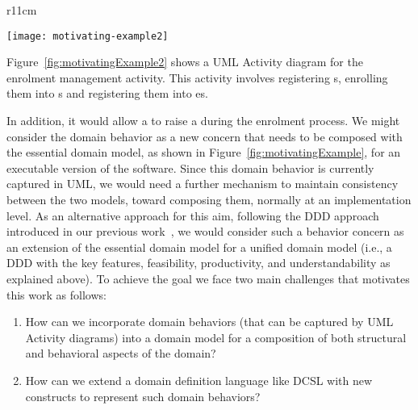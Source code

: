 {\makeatletter
	\let\par\@@par
	\par{}
	\everypar{}
\begin{wrapfigure}{r}{11cm}
	\begin{center}
\vspace{-0.8cm}		\texttt{[image: motivating-example2]}
	\end{center}
\vspace{-0.5cm}
	\caption{A UML Activity diagram to represent the enrolment management activity.}
	\label{fig:motivatingExample2}
\end{wrapfigure}
%
Figure~\ref{fig:motivatingExample2} shows a UML Activity diagram for the enrolment management activity. This activity involves registering s, enrolling them into s and registering them into es.%
\par}%
\noindent In addition, it would allow a  to raise a  during the enrolment process. %
%
We might consider the domain behavior as a new concern that needs to be composed with the essential domain model, as shown in Figure~\ref{fig:motivatingExample}, for an executable version of the software. Since this domain behavior is currently captured in UML, we would need a further mechanism to maintain consistency between the two models, toward composing them, normally at an implementation level. As an alternative approach for this aim, following the DDD approach introduced in our previous work~\cite{le_domain_2018}, we would consider such a behavior concern as an extension of the essential domain model for a unified domain model (i.e., a DDD with the key features, feasibility, productivity, and understandability as explained above). To achieve the goal we face two main challenges that motivates this work as follows:

\begin{enumerate}
    \item How can we incorporate domain behaviors (that can be captured by UML Activity diagrams) into a domain model for a composition of both structural and behavioral aspects of the domain?
    \item How can we extend a domain definition language like DCSL with new constructs to represent such domain behaviors?    
\end{enumerate}
